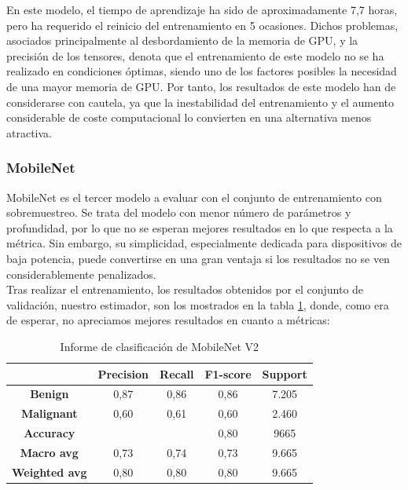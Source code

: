 En este modelo, el tiempo de aprendizaje ha sido de aproximadamente 7,7 horas, pero ha requerido el reinicio del entrenamiento en 5 ocasiones. Dichos problemas, asociados principalmente al desbordamiento de la memoria de GPU, y la precisión de los tensores, denota que el entrenamiento de este modelo no se ha realizado en condiciones óptimas, siendo uno de los factores posibles la necesidad de una mayor memoria de GPU. Por tanto, los resultados de este modelo han de considerarse con cautela, ya que la inestabilidad del entrenamiento y el aumento considerable de coste computacional lo convierten en una alternativa menos atractiva.

\subsubsection{MobileNet}

MobileNet es el tercer modelo a evaluar con el conjunto de entrenamiento con sobremuestreo. Se trata del modelo con menor número de parámetros y profundidad, por lo que no se esperan mejores resultados en lo que respecta  a la métrica. Sin embargo, su simplicidad, especialmente dedicada para dispositivos de baja potencia, puede convertirse en una gran ventaja si los resultados no se ven considerablemente penalizados.\\

Tras realizar el entrenamiento, los resultados obtenidos por el conjunto de validación, nuestro estimador, son los mostrados en la tabla \ref{tab:mob}, donde, como era de esperar, no apreciamos mejores resultados en cuanto a métricas:   

\begin{table}[H]
	\centering
	\begin{tabular}{|c|c|c|c|c|}
		\hline
		\textbf{} & \textbf{Precision} & \textbf{Recall} & \textbf{F1-score} & \textbf{Support} \\ \hline
		\textbf{Benign} & 0,87 & 0,86 & 0,86 & 7.205 \\ \hline
		\textbf{Malignant} & 0,60 & 0,61 & 0,60 & 2.460 \\ \hline
		\textbf{Accuracy} &  &  & 0,80 & 9665 \\ \hline
		\textbf{Macro avg} & 0,73 & 0,74 & 0,73 & 9.665 \\ \hline
		\textbf{Weighted avg} & 0,80& 0,80 & 0,80 & 9.665 \\ \hline
	\end{tabular}
	\caption{Informe de clasificación de MobileNet V2}
	\label{tab:mob}
\end{table}


